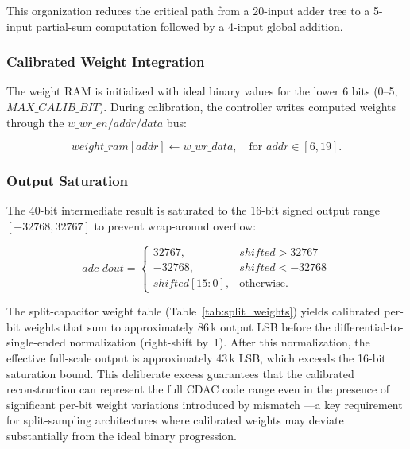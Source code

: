 \documentclass[journal]{IEEEtran}
\begin{document}
This organization reduces the critical path from a 20-input adder tree to a
5-input partial-sum computation followed by a 4-input global addition.

\subsubsection{Calibrated Weight Integration}

The weight RAM is initialized with ideal binary values for the lower 6 bits
(0--5, $MAX\_CALIB\_BIT$). During calibration, the controller writes computed
weights through the $w\_wr\_en/addr/data$ bus:

\begin{equation}
weight\_ram[addr] \gets w\_wr\_data,\quad \text{for } addr \in [6, 19].
\label{eq:weight_write}
\end{equation}

\subsubsection{Output Saturation}

The 40-bit intermediate result is saturated to the 16-bit signed output range
$[-32768, 32767]$ to prevent wrap-around overflow:

\begin{equation}
adc\_dout = \begin{cases}
32767,  & shifted > 32767 \\
-32768, & shifted < -32768 \\
shifted[15:0], & \text{otherwise}.
\end{cases}
\label{eq:saturation}
\end{equation}

The split-capacitor weight table (Table~\ref{tab:split_weights}) yields
calibrated per-bit weights that sum to approximately 86\,k output LSB before
the differential-to-single-ended normalization (right-shift by~1). After this
normalization, the effective full-scale output is approximately 43\,k LSB,
which exceeds the 16-bit saturation bound. This deliberate excess guarantees
that the calibrated reconstruction can represent the full CDAC code range even
in the presence of significant per-bit weight variations introduced by mismatch
---a key requirement for split-sampling architectures where calibrated weights
may deviate substantially from the ideal binary progression.

\end{document}
